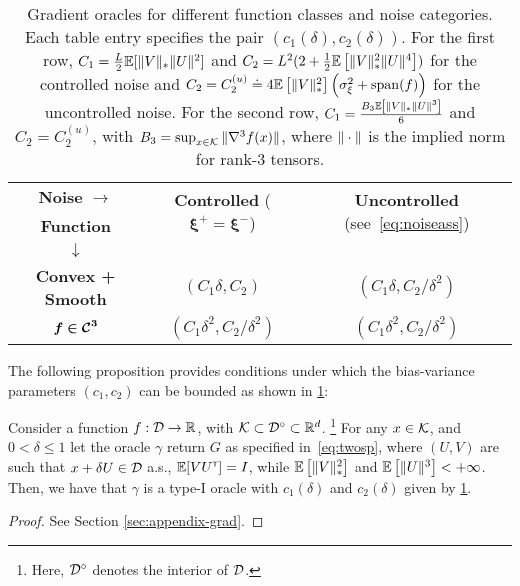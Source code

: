 \begin{table*}
\small
\centering
\begin{tabular}{|c|c|c|}
\toprule
\textbf{Noise }$\bm{ \rightarrow}$ & \multirow{2}{*}{\textbf{Controlled }($\bm{\xi^+ = \xi^-}$)} & \multirow{2}{*}{\textbf{Uncontrolled }(see~\eqref{eq:noiseass})} \\
\textbf{Function } &&\\
$\bm{\downarrow}$ &&\\\midrule
\multirow{2}{*}{\textbf{Convex + Smooth}} & \multirow{2}{*}{$(C_1 \delta, C_2)$} & \multirow{2}{*}{$(C_1\delta, C_2/\delta^2)$}\\
 &&\\\midrule
\multirow{2}{*}{$\bm{f \in \mathcal{C}^3}$} & \multirow{2}{*}{$(C_1 \delta^2, C_2/\delta^2)$} & \multirow{2}{*}{$(C_1 \delta^2, C_2/\delta^2)$} \\
 &&\\\bottomrule
\end{tabular}
\caption{Gradient oracles for different function classes and noise categories. Each table entry specifies the pair $(c_1(\delta), c_2(\delta))$.
For the first row, $C_1 =
\frac{L}{2} \mathbb{E}[ \|V\|_* \|U\|^2]$ and
$C_2 =   L^2 (2 + \frac{1}{2}\mathbb{E}\left[ \|V\|_*^2 \|U\|^4 \right])$
for the controlled noise and
 $C_2 =  C_{2}^{(u)} \doteq 4 \mathbb{E}\left[\|V\|_*^2\right]\left( \sigma_\xi^2+\operatorname{span}(f)\right)$ for the uncontrolled noise.
For the second row, $C_1 = \frac{B_3 \mathbb{E}\left[ \|V\|_* \|U\|^3 \right]}{6}$ and $C_2 =  C_{2}^{(u)}$,
with $B_3 = \sup_{x\in \mathcal{K}} \|\nabla^3 f(x)\|$, where $\|\cdot\|$ is the implied norm for rank-3 tensors.
}
\label{tab:oracles}
\end{table*}
The following proposition provides conditions under which the bias-variance parameters $(c_1,c_2)$ can be bounded as shown in \cref{tab:oracles}:
\begin{proposition}
\label{prop:grad-spsa}
Consider a function $f:\mathcal{D} \to \mathbb{R}$, with $\mathcal{K} \subset \mathcal{D}^\circ \subset \mathbb{R}^d$.%
\footnote{Here, $\mathcal{D}^\circ$ denotes the interior of $\mathcal{D}$.}
For any $x \in \mathcal{K}$, and $0< \delta \le 1$ let the oracle $\gamma$ return $G$ as specified in~\eqref{eq:twosp},
where $(U,V)$ are such that $x+\delta U \in \mathcal{D}$ a.s.,
$\mathbb{E}[V U^\mathsf{\scriptscriptstyle T}] = I$, while
$\mathbb{E}\left[\|V\|_*^2\right]$ and $\mathbb{E}\left[ \|U\|^3 \right]<+\infty$.
Then, we have that $\gamma$ is a type-I oracle with $c_1(\delta)$ and $c_2(\delta)$ given by \cref{tab:oracles}.
\end{proposition}
\begin{proof}
See Section \ref{sec:appendix-grad}.
\end{proof}

